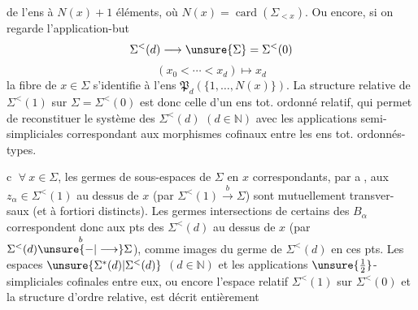 de l'ens à $N(x)+1$ éléments, où $N(x)=\operatorname{card}(\Sigma_{<x})$.
Ou encore, si on regarde l'application-but
\[
\Sigma^{<}(d)\longrightarrow\unsure{\Sigma}=\Sigma^{<}(0)
\]
\[
(x_0<\cdots<x_d)\longmapsto x_d
\]
la fibre de $x\in\Sigma$ s'identifie à l'ens 
$\mathfrak P_d(\{1,\ldots,N(x)\})$.
La structure relative de $\Sigma^{<}(1)$ sur $\Sigma=\Sigma^{<}(0)$
est donc celle d'un ens tot. ordonné relatif, qui
permet de reconstituer le système des $\Sigma^{<}(d)$
 $(d\in\mathbb N)$ avec les applications semi-simpliciales
correspondant aux morphismes cofinaux entre
les ens tot. ordonnés-types.

\textcircled{c} $\forall\ x\in\Sigma$, les germes  de sous-espaces  de $\Sigma$ en $x$
correspondants, par \textcircled{a}, aux $z_\alpha\in\Sigma^{<}(1)$ au dessus
de $x$ (par $\Sigma^{<}(1)\xrightarrow{b}\Sigma$) sont mutuellement transver-
saux (et à fortiori distincts).
Les germes intersections de certains des $B_\alpha$
correspondent donc aux pts des $\Sigma^{<}(d)$ au dessus
de $x$ (par $\Sigma^{<}(d)\overset{b}{\unsure{-|\longrightarrow}}\Sigma$), comme
images du  germe de $\Sigma^{<}(d)$ en ces pts.
Les espaces $\unsure{\Sigma^{*}(d)|\Sigma^{<}(d)}$ $(d\in\mathbb N)$ et les
applications $\unsure{\tfrac12}$-simpliciales cofinales entre eux, 
ou encore l'espace relatif $\Sigma^{<}(1)$ sur $\Sigma^{<}(0)$ et la
structure d'ordre relative, est décrit entièrement
